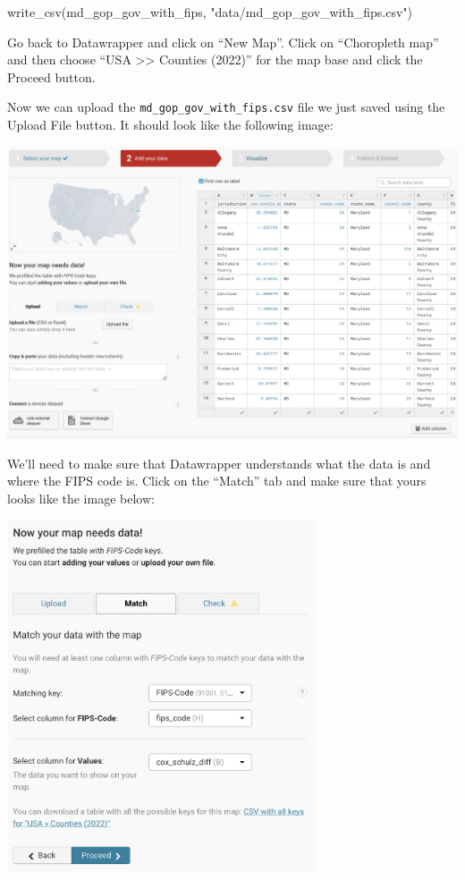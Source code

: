 \documentclass[
  letterpaper,
  DIV=11,
  numbers=noendperiod]{scrreprt}
\newenvironment{Shaded}{\begin{snugshade}}{\end{snugshade}}
\newcommand{\FunctionTok}[1]{\textcolor[rgb]{0.28,0.35,0.67}{#1}}
\newcommand{\NormalTok}[1]{\textcolor[rgb]{0.00,0.23,0.31}{#1}}
\newcommand{\StringTok}[1]{\textcolor[rgb]{0.13,0.47,0.30}{#1}}
\begin{document}
\begin{Shaded}
\begin{Highlighting}[]
\FunctionTok{write\_csv}\NormalTok{(md\_gop\_gov\_with\_fips, }\StringTok{"data/md\_gop\_gov\_with\_fips.csv"}\NormalTok{)}
\end{Highlighting}
\end{Shaded}

Go back to Datawrapper and click on ``New Map''. Click on ``Choropleth
map'' and then choose ``USA \textgreater\textgreater{} Counties (2022)''
for the map base and click the Proceed button.

Now we can upload the \texttt{md\_gop\_gov\_with\_fips.csv} file we just
saved using the Upload File button. It should look like the following
image:

\includegraphics[width=9.01in,height=\textheight]{./images/datawrapper7.png}

We'll need to make sure that Datawrapper understands what the data is
and where the FIPS code is. Click on the ``Match'' tab and make sure
that yours looks like the image below:

\includegraphics[width=3.59in,height=\textheight]{./images/datawrapper8.png}
\end{document}
